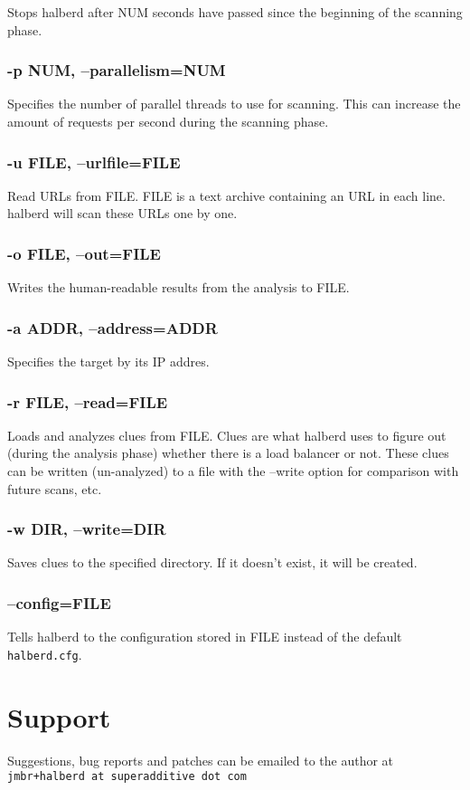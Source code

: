 \documentclass[a4paper]{book}
\begin{document}
Stops halberd after NUM seconds have passed since the beginning of the
scanning phase.

\subsection{-p NUM, --parallelism=NUM}

Specifies the number of parallel threads to use for scanning.  This can
increase the amount of requests per second during the scanning phase.

\subsection{-u FILE, --urlfile=FILE}

Read URLs from FILE.  FILE is a text archive containing an URL in each line.
halberd will scan these URLs one by one.

\subsection{-o FILE, --out=FILE}

Writes the human-readable results from the analysis to FILE.

\subsection{-a ADDR, --address=ADDR}

Specifies the target by its IP addres.

\subsection{-r FILE, --read=FILE}

Loads and analyzes clues from FILE.  Clues are what halberd uses to figure out
(during the analysis phase) whether there is a load balancer or not.  These
clues can be written (un-analyzed) to a file with the --write option for
comparison with future scans, etc.

\subsection{-w DIR, --write=DIR}

Saves clues to the specified directory.  If it doesn't exist, it will be
created.

\subsection{--config=FILE}

Tells halberd to the configuration stored in FILE instead of the default
\verb|halberd.cfg|.

\chapter{Support}

Suggestions, bug reports and patches can be emailed to the author at
\verb|jmbr+halberd at superadditive dot com|
\end{document}
